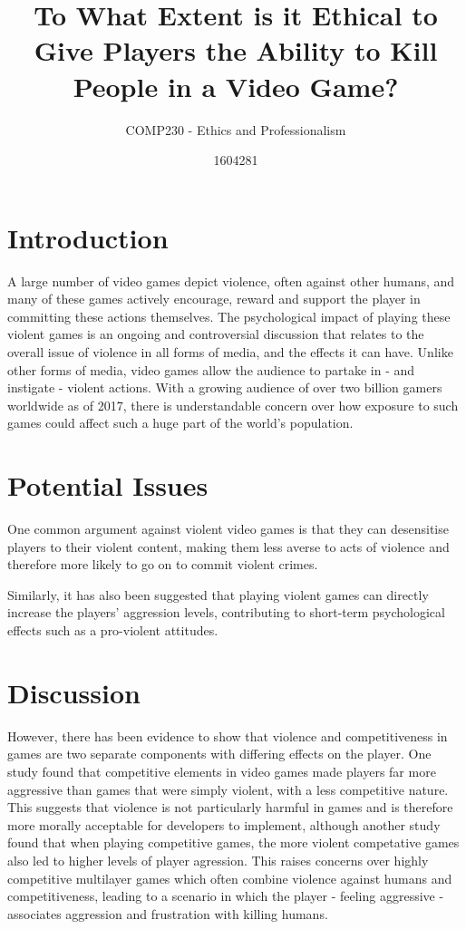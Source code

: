 \documentclass{scrartcl}
\title{To What Extent is it Ethical to Give Players the Ability to Kill People in a Video Game?}
\subtitle{COMP230 - Ethics and Professionalism}
\author{1604281}
\begin{document}
	
	\maketitle
	
	\abstract{}
	
	\section{Introduction}
		A large number of video games depict violence, often against other humans, and many of these games actively encourage, reward and support the player in committing these actions themselves. \cite{esaReport} The psychological impact of playing these violent games is an ongoing and controversial discussion that relates to the overall issue of violence in all forms of media, and the effects it can have. Unlike other forms of media, video games allow the audience to partake in - and instigate - violent actions. With a growing audience of over two billion gamers worldwide as of 2017, there is understandable concern over how exposure to such games could affect such a huge part of the world's population. \cite{numberOfGamers}
		
	
	\section{Potential Issues}
		One common argument against violent video games is that they can desensitise players to their violent content, making them less averse to acts of violence and therefore more likely to go on to commit violent crimes. \cite{devalueViolence} \cite{ExposureLink}
		
		Similarly, it has also been suggested that playing violent games can directly increase the players' aggression levels, contributing to short-term psychological effects such as a pro-violent attitudes. \cite{anderson2007violent}
	
	
	\section{Discussion}
		However, there has been evidence to show that violence and competitiveness in games are two separate components with differing effects on the player. One study found that competitive elements in video games made players far more aggressive than games that were simply violent, with a less competitive nature. \cite{Competativness} This suggests that violence is not particularly harmful in games and is therefore more morally acceptable for developers to implement, although another study found that when playing competitive games, the more violent competative games also led to higher levels of player agression. \cite{ViolenceSports} This raises concerns over highly competitive multilayer games which often combine violence against humans and competitiveness, leading to a scenario in which the player - feeling aggressive - associates aggression and frustration with killing humans. 
		
\end{document}
